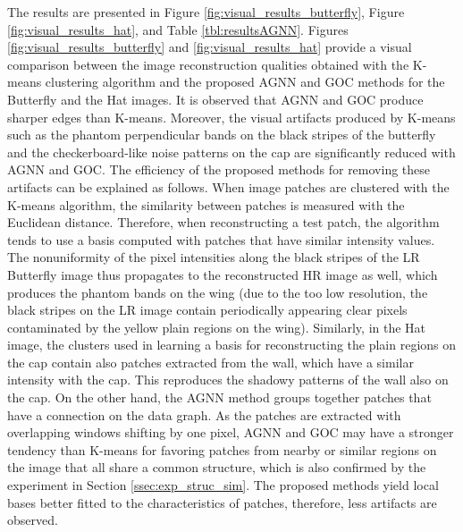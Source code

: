\documentclass[journal]{IEEEtran}
\begin{document}
The results are presented in Figure \ref{fig:visual_results_butterfly}, Figure \ref{fig:visual_results_hat}, and Table \ref{tbl:resultsAGNN}. Figures \ref{fig:visual_results_butterfly} and \ref{fig:visual_results_hat} provide a visual comparison between the image reconstruction qualities obtained with the K-means clustering algorithm and the proposed AGNN and GOC methods for the Butterfly and the Hat images. It is observed that AGNN and GOC produce sharper edges than K-means. Moreover, the visual artifacts produced by K-means such as the phantom perpendicular bands on the black stripes of the butterfly and the checkerboard-like noise patterns on the cap are significantly reduced with AGNN and GOC. The efficiency of the proposed methods for removing these artifacts can be explained as follows. When image patches are clustered with the K-means algorithm, the similarity between patches is measured with the Euclidean distance. Therefore, when reconstructing a test patch, the algorithm tends to use a basis computed with patches that have similar intensity values. The nonuniformity of the pixel intensities along the black stripes of the LR Butterfly image thus propagates to the reconstructed HR image as well, which produces the phantom bands on the wing (due to the too low resolution, the black stripes on the LR image contain periodically appearing clear pixels contaminated by the yellow plain regions on the wing). Similarly, in the Hat image, the clusters used in learning a basis for reconstructing the plain regions on the cap contain also patches extracted from the wall, which have a similar intensity with the cap. This reproduces the shadowy patterns of the wall also on the cap. On the other hand, the AGNN method groups together patches that have a connection on the data graph. As the patches are extracted with overlapping windows shifting by one pixel, AGNN and GOC may have a stronger tendency than K-means for favoring patches from nearby or similar regions on the image that all share a common structure, which is also confirmed by the experiment in Section \ref{ssec:exp_struc_sim}. The proposed methods yield local bases better fitted to the characteristics of patches, therefore, less artifacts are observed.
\end{document}
